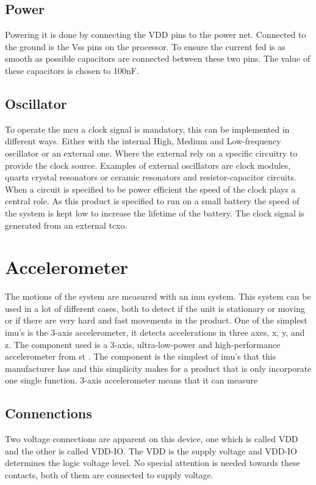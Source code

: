 
\subsection{Power}
Powering it is done by connecting the VDD pins to the power net. Connected to the ground is the Vss pins on the processor. To ensure the current fed is as smooth as possible capacitors are connected between these two pins. The value of these capacitors is chosen to 100nF.  

\subsection{Oscillator}
To operate the \gls{mcu} a clock signal is mandatory, this can be implemented in different ways. Either with the internal High, Medium and Low-frequency oscillator or an external one. Where the external rely on a specific circuitry to provide the clock source. Examples of external oscillators are clock modules, quartz crystal resonators or ceramic resonators and resistor-capacitor circuits. When a circuit is specified to be power efficient the speed of the clock plays a central role. As this product is specified to run on a small battery the speed of the system is kept low to increase the lifetime of the battery. The clock signal is generated from an external \gls{tcxo}.


\newpage %
\section{Accelerometer} 
The motions of the system are measured with an \gls{imu} system. This system can be used in a lot of different cases, both to detect if the unit is stationary or moving or if there are very hard and fast movements in the product. One of the simplest \gls{imu}'s is the 3-axis accelerometer, it detects accelerations in three axes, x, y, and z. The component used is a 3-axis, ultra-low-power and high-performance accelerometer from \gls{st} \cite{ST_acc}. The component is the simplest of \gls{imu}'s that this manufacturer has and this simplicity makes for a product that is only incorporate one single function. 3-axis accelerometer means that it can measure  

\subsection{Connenctions}
Two voltage connections are apparent on this device, one which is called VDD and the other is called VDD-IO. The VDD is the supply voltage and VDD-IO determines the logic voltage level. 
No special attention is needed towards these contacts, both of them are connected to supply voltage. 

